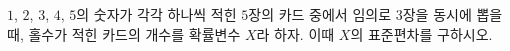 $1$, $2$, $3$, $4$, $5$의 숫자가 각각 하나씩 적힌 $5$장의 카드 중에서 임의로 $3$장을 동시에 뽑을 때, 홀수가 적힌 카드의 개수를 확률변수 $X$라 하자. 이때 $X$의 표준편차를 구하시오.
